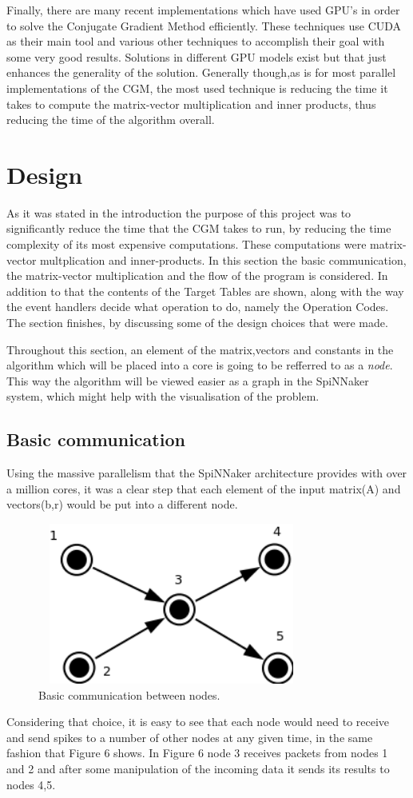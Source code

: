 \documentclass[12pt,a4paper]{article}
\begin{document}
Finally, there are many recent implementations which have used GPU's in order to solve the Conjugate Gradient Method efficiently. These techniques use CUDA as their main tool and various other techniques to accomplish their goal with some very good results. Solutions in different GPU models exist but that just enhances the generality of the solution. Generally though,as is for most parallel implementations of the CGM, the most used technique is reducing the time it takes to compute the matrix-vector multiplication and inner products, thus reducing the time of the algorithm overall\cite{galiano2012gpu}\cite{wozniak2010parallel}.
\section{Design}
As it was stated in the introduction the purpose of this project was to significantly reduce the time that the CGM takes to run, by reducing the time complexity of its most expensive computations. These computations were matrix-vector multplication and inner-products. In this section the basic communication, the matrix-vector multiplication and the flow of the program is considered. In addition to that the contents of the Target Tables are shown, along with the way the event handlers decide what operation to do, namely the Operation Codes. The section finishes, by discussing some of the design choices that were made. 

Throughout this section, an element of the matrix,vectors and constants in the algorithm which will be placed into a core is going to be refferred to as a \emph{node}. This way the algorithm will be viewed easier as a graph in the SpiNNaker system, which might help with the visualisation of the problem.

\subsection{Basic communication}
Using the massive parallelism that the SpiNNaker architecture provides with over a million cores, it was a clear step that each element of the input matrix(A) and vectors(b,r) would be put into a different node. 
\begin{figure}[h!]
\includegraphics[width=250pt,height=150pt,scale=2]{Pics/basic.png}
\centering
\caption{Basic communication between nodes.}
\end{figure}
Considering that choice, it is easy to see that each node would need to receive and send spikes to a number of other nodes at any given time, in the same fashion that Figure 6 shows. In Figure 6 node 3 receives packets from nodes 1 and 2 and after some manipulation of the incoming data it sends its results to nodes 4,5. 
\end{document}
